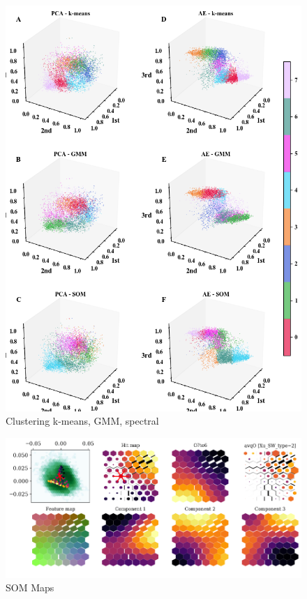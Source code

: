\documentclass[utf8]{frontiersSCNS} %
\begin{document}
\begin{figure}[h!]
	\begin{center}
		\includegraphics[width=16cm]{Roberts/clustering}%
	\end{center}
	\caption{ Clustering k-means, GMM, spectral}\label{fig:clustering}
\end{figure}

\begin{figure}[h!]
	\begin{center}
		\includegraphics[width=16cm]{maps}%
	\end{center}
	\caption{ SOM Maps}\label{fig:maps}
\end{figure}
\end{document}
